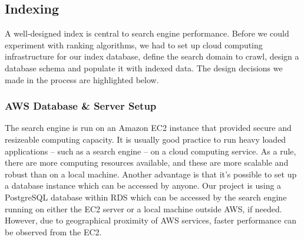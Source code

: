 \begin{table}[H]
\centering
\caption{Composition of test datasets}
\label{dataset-table}
\end{table}


\subsection{Indexing} %
\label{sub:methods}
A well-designed index is central to search engine performance. Before we could experiment with ranking algorithms, we had to set up cloud computing infrastructure for our index database, define the search domain to crawl, design a database schema and populate it with indexed data. The design decisions we made in the process are highlighted below. %

\subsubsection{AWS Database \& Server Setup} %
\label{ssub:database_and_server_setup}

The search engine is run on an Amazon EC2 instance that provided secure and resizeable computing capacity. It is usually good practice to run heavy loaded applications -- such as a search engine -- on a cloud computing service. As a rule, there are more computing resources available, and these are more scalable and robust than on a local machine. Another advantage is that it's possible to set up a database instance which can be accessed by anyone. Our project is using a PostgreSQL database within RDS which can be accessed by the search engine running on either the EC2 server or a local machine outside AWS, if needed. However, due to geographical proximity of AWS services, faster performance can be observed from the EC2.\\

